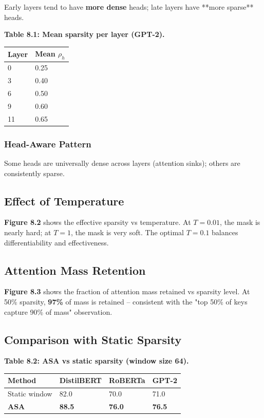 Early layers tend to have \textbf{more dense} heads; late layers have **more 
sparse** heads.

\textbf{Table 8.1: Mean sparsity per layer (GPT-2).}

\begin{table}[H]
\centering
\small
\begin{tabular}{ll}
\toprule
\textbf{Layer} & \textbf{Mean $\rho_h$} \\
\midrule
0 & 0.25 \\
3 & 0.40 \\
6 & 0.50 \\
9 & 0.60 \\
11 & 0.65 \\
\bottomrule
\end{tabular}
\end{table}

\subsubsection{Head-Aware Pattern}

Some heads are universally dense across layers (attention sinks); others 
are consistently sparse.

\subsection{Effect of Temperature}

\textbf{Figure 8.2} shows the effective sparsity vs temperature. At $T = 0.01$, 
the mask is nearly hard; at $T = 1$, the mask is very soft. The optimal 
$T = 0.1$ balances differentiability and effectiveness.

\subsection{Attention Mass Retention}

\textbf{Figure 8.3} shows the fraction of attention mass retained vs sparsity 
level. At 50\% sparsity, \textbf{97\%} of mass is retained -- consistent 
with the "top 50\% of keys capture 90\% of mass" observation.

\subsection{Comparison with Static Sparsity}

\textbf{Table 8.2: ASA vs static sparsity (window size 64).}

\begin{table}[H]
\centering
\small
\begin{tabular}{llll}
\toprule
\textbf{Method} & \textbf{DistilBERT} & \textbf{RoBERTa} & \textbf{GPT-2} \\
\midrule
Static window & 82.0 & 70.0 & 71.0 \\
\textbf{ASA} & \textbf{88.5} & \textbf{76.0} & \textbf{76.5} \\
\bottomrule
\end{tabular}
\end{table}

